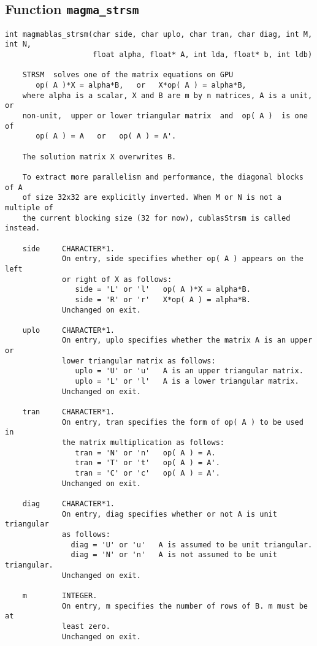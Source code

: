 \documentclass[10pt]{book}
\begin{document}
\subsection{Function {\tt {\bf magma\_strsm}}}
\begin{verbatim}
int magmablas_strsm(char side, char uplo, char tran, char diag, int M, int N,
                    float alpha, float* A, int lda, float* b, int ldb)
   
    STRSM  solves one of the matrix equations on GPU
       op( A )*X = alpha*B,   or   X*op( A ) = alpha*B,   
    where alpha is a scalar, X and B are m by n matrices, A is a unit, or
    non-unit,  upper or lower triangular matrix  and  op( A )  is one  of 
       op( A ) = A   or   op( A ) = A'.

    The solution matrix X overwrites B.

    To extract more parallelism and performance, the diagonal blocks of A 
    of size 32x32 are explicitly inverted. When M or N is not a multiple of 
    the current blocking size (32 for now), cublasStrsm is called instead. 
   
    side     CHARACTER*1.
             On entry, side specifies whether op( A ) appears on the left
             or right of X as follows:
                side = 'L' or 'l'   op( A )*X = alpha*B.
                side = 'R' or 'r'   X*op( A ) = alpha*B.  
             Unchanged on exit.
  
    uplo     CHARACTER*1.
             On entry, uplo specifies whether the matrix A is an upper or
             lower triangular matrix as follows:
                uplo = 'U' or 'u'   A is an upper triangular matrix.
                uplo = 'L' or 'l'   A is a lower triangular matrix.
             Unchanged on exit.
   
    tran     CHARACTER*1.
             On entry, tran specifies the form of op( A ) to be used in
             the matrix multiplication as follows:
                tran = 'N' or 'n'   op( A ) = A.   
                tran = 'T' or 't'   op( A ) = A'.  
                tran = 'C' or 'c'   op( A ) = A'.
             Unchanged on exit.
   
    diag     CHARACTER*1.
             On entry, diag specifies whether or not A is unit triangular
             as follows:
               diag = 'U' or 'u'   A is assumed to be unit triangular.   
               diag = 'N' or 'n'   A is not assumed to be unit triangular.
             Unchanged on exit.

    m        INTEGER.
             On entry, m specifies the number of rows of B. m must be at
             least zero.
             Unchanged on exit.
   

\end{verbatim}
\end{document}
